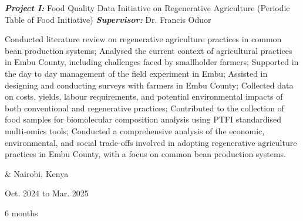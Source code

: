 \documentclass[10pt, letterpaper]{article}
\let\originalTabularx\tabularx
\let\originalEndTabularx\endtabularx
\renewenvironment{tabularx}{\bgroup\centering\originalTabularx}{\originalEndTabularx\par\egroup}
\begin{document}
        \begin{tabularx}{
            \textwidth-0.4 cm-0.13cm
        }{
            K{0.2 cm}
            R{3.5 cm}
        }

            \textbf{\textit{Project I:}} Food Quality Data Initiative on Regenerative Agriculture (Periodic Table of Food Initiative)
            \hspace{2 cm}
            \textbf{\textit{Supervisor:}} Dr. Francis Oduor\\
            
            \vspace{0.01 cm}
            \begin{myenumerate}
                \item[\textcolor{primaryColor}{\faCheckCircle[regular]}] Conducted literature review on regenerative agriculture practices in common bean production systems; Analysed the current context of agricultural practices in Embu County, including challenges faced by smallholder farmers; Supported in the day to day management of the field experiment in Embu; Assisted in designing and conducting surveys with farmers in Embu County; Collected data on costs, yields, labour requirements, and potential environmental impacts of both conventional and regenerative practices; Contributed to the collection of food samples for biomolecular composition analysis using PTFI standardised multi‐omics tools; Conducted a comprehensive analysis of the economic, environmental, and social trade‐offs involved in adopting regenerative agriculture practices in Embu County, with a focus on common bean production systems.
                \end{myenumerate}
            &
            Nairobi, Kenya
            
            Oct. 2024 to Mar. 2025
            
            6 months
        \end{tabularx}

        \vspace{0.2 cm}
        
\end{document}
